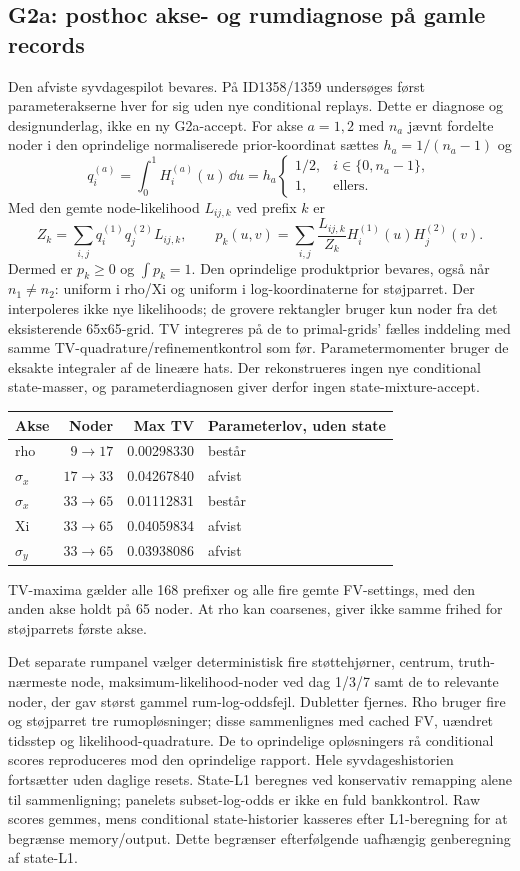 \subsection{G2a: posthoc akse- og rumdiagnose på gamle records}
Den afviste syvdagespilot bevares. På ID1358/1359 undersøges først
parameterakserne hver for sig uden nye conditional replays. Dette er
diagnose og designunderlag, ikke en ny G2a-accept.
For akse $a=1,2$ med $n_a$ jævnt fordelte noder i den oprindelige
normaliserede prior-koordinat sættes $h_a=1/(n_a-1)$ og
\[
 q_i^{(a)}=\int_0^1 H_i^{(a)}(u)\,\dd u
 =h_a\begin{cases}1/2,&i\in\{0,n_a-1\},\\1,&\text{ellers}.\end{cases}
\]
Med den gemte node-likelihood $L_{ij,k}$ ved prefix $k$ er
\[
 Z_k=\sum_{i,j}q_i^{(1)}q_j^{(2)}L_{ij,k},\qquad
 p_k(u,v)=\sum_{i,j}\frac{L_{ij,k}}{Z_k}
 H_i^{(1)}(u)H_j^{(2)}(v).
\]
Dermed er $p_k\ge0$ og $\int p_k=1$. Den oprindelige produktprior
bevares, også når $n_1\ne n_2$: uniform i rho/Xi og uniform i
log-koordinaterne for støjparret. Der interpoleres ikke nye likelihoods;
de grovere rektangler bruger kun noder fra det eksisterende 65x65-grid.
TV integreres på de to primal-grids' fælles inddeling med samme
TV-quadrature/refinementkontrol som før. Parametermomenter bruger de
eksakte integraler af de lineære hats. Der rekonstrueres ingen nye
conditional state-masser, og parameterdiagnosen giver derfor ingen
state-mixture-accept.

\begin{center}
\begin{tabular}{lrrl}
\toprule
Akse & Noder & Max TV & Parameterlov, uden state \\
\midrule
rho & $9\to17$ & 0.00298330 & består \\
$\sigma_x$ & $17\to33$ & 0.04267840 & afvist \\
$\sigma_x$ & $33\to65$ & 0.01112831 & består \\
Xi & $33\to65$ & 0.04059834 & afvist \\
$\sigma_y$ & $33\to65$ & 0.03938086 & afvist \\
\bottomrule
\end{tabular}
\end{center}
TV-maxima gælder alle 168 prefixer og alle fire gemte FV-settings, med
den anden akse holdt på 65 noder. At rho kan coarsenes, giver ikke samme
frihed for støjparrets første akse.


Det separate rumpanel vælger deterministisk fire støttehjørner, centrum,
truth-nærmeste node, maksimum-likelihood-noder ved dag 1/3/7 samt de to
relevante noder, der gav størst gammel rum-log-oddsfejl. Dubletter fjernes.
Rho bruger fire og støjparret tre rumopløsninger; disse sammenlignes med cached FV, uændret tidsstep og
likelihood-quadrature. De to oprindelige opløsningers rå conditional scores
reproduceres mod den oprindelige rapport. Hele syvdageshistorien fortsætter
uden daglige resets. State-L1 beregnes ved konservativ remapping alene til
sammenligning; panelets subset-log-odds er ikke en fuld bankkontrol.
Raw scores gemmes, mens conditional state-historier kasseres efter
L1-beregning for at begrænse memory/output. Dette begrænser efterfølgende
uafhængig genberegning af state-L1.


